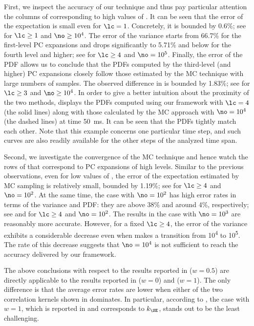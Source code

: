 First, we inspect the accuracy of our technique and thus pay particular
attention the columns of  corresponding to
high values of \no. It can be seen that the error of the expectation is small
even for $\lc = 1$. Concretely, it is bounded by 0.6\%; see \error{\expectation}
for $\lc \geq 1$ and $\no \geq 10^4$. The error of the variance starts from
66.7\% for the first-level \ac{PC} expansions and drops significantly to 5.71\%
and below for the fourth level and higher; see \error{\variance} for $\lc \geq
4$ and $\no = 10^5$. Finally, the error of the \ac{PDF} allows us to conclude
that the \acp{PDF} computed by the third-level (and higher) \ac{PC} expansions
closely follow those estimated by the \ac{MC} technique with large numbers of
samples. The observed difference in  is
bounded by 1.83\%; see  for $\lc \geq 3$ and $\no \geq 10^4$. In order
to give a better intuition about the proximity of the two methods,
 displays the \acp{PDF} computed using our
framework with $\lc = 4$ (the solid lines) along with those calculated by the
\ac{MC} approach with $\no = 10^4$ (the dashed lines) at time 50~ms. It can be
seen that the \acp{PDF} tightly match each other. Note that this example
concerns one particular time step, and such curves are also readily available
for the other steps of the analyzed time span.

Second, we investigate the convergence of the \ac{MC} technique and hence watch
the rows of  that correspond to \ac{PC}
expansions of high levels. Similar to the previous observations, even for low
values of \no, the error of the expectation estimated by \ac{MC} sampling is
relatively small, bounded by 1.19\%; see \error{\expectation} for $\lc \geq 4$
and $\no = 10^2$. At the same time, the case with $\no = 10^2$ has high error
rates in terms of the variance and \ac{PDF}: they are above 38\% and around 4\%,
respectively; see \error{\variance} and  for $\lc \geq 4$ and $\no =
10^2$. The results in the case with $\no = 10^3$ are reasonably more accurate.
However, for a fixed $\lc \geq 4$, the error of the variance exhibits a
considerable decrease even when \no makes a transition from
10\textsuperscript{4} to 10\textsuperscript{5}. The rate of this decrease
suggests that $\no = 10^4$ is not sufficient to reach the accuracy delivered by
our framework.

The above conclusions with respect to the results reported in
 ($w = 0.5$) are directly applicable to the
results reported in  ($w = 0$) and
 ($w = 1$). The only difference is that the
average error rates are lower when either of the two correlation kernels shown
in  dominates. In particular, according to
\error{\variance}, the case with $w = 1$, which is reported in
 and corresponds to $k_\SE$, stands out to be
the least challenging.

